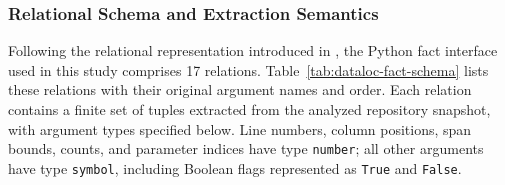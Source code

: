 \subsubsection{Relational Schema and Extraction Semantics}\label{sec:facts-schema-dataloc}
Following the relational representation introduced in , the Python fact interface used in this study comprises 17 relations. Table~\ref{tab:dataloc-fact-schema} lists these relations with their original argument names and order. Each relation contains a finite set of tuples extracted from the analyzed repository snapshot, with argument types specified below. Line numbers, column positions, span bounds, counts, and parameter indices have type \texttt{number}; all other arguments have type \texttt{symbol}, including Boolean flags represented as \texttt{True} and \texttt{False}.

